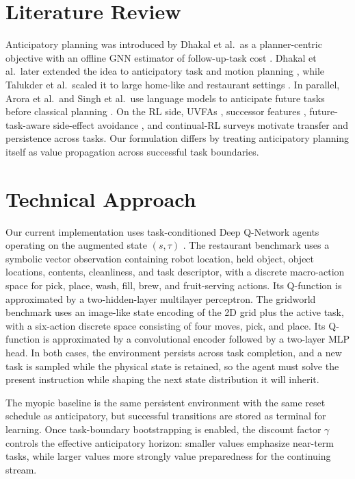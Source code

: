 \documentclass{article}
\begin{document}
\section{Literature Review}
Anticipatory planning was introduced by Dhakal et al.\ as a planner-centric objective with an offline GNN estimator of follow-up-task cost \cite{dhakal2023anticipatory}. Dhakal et al.\ later extended the idea to anticipatory task and motion planning \cite{dhakal2024tamp}, while Talukder et al.\ scaled it to large home-like and restaurant settings \cite{talukder2024large}. In parallel, Arora et al.\ and Singh et al.\ use language models to anticipate future tasks before classical planning \cite{arora2024anticipate,singh2024anticipate}. On the RL side, UVFAs \cite{schaul2015uvfa}, successor features \cite{barreto2017successor}, future-task-aware side-effect avoidance \cite{krakovna2020avoiding}, and continual-RL surveys \cite{khetarpal2022continual} motivate transfer and persistence across tasks. Our formulation differs by treating anticipatory planning itself as value propagation across successful task boundaries.

\section{Technical Approach}
Our current implementation uses task-conditioned Deep Q-Network agents operating on the augmented state $(s,\tau)$ \cite{mnih2015dqn}. The restaurant benchmark uses a symbolic vector observation containing robot location, held object, object locations, contents, cleanliness, and task descriptor, with a discrete macro-action space for pick, place, wash, fill, brew, and fruit-serving actions. Its Q-function is approximated by a two-hidden-layer multilayer perceptron. The gridworld benchmark uses an image-like state encoding of the 2D grid plus the active task, with a six-action discrete space consisting of four moves, pick, and place. Its Q-function is approximated by a convolutional encoder followed by a two-layer MLP head. In both cases, the environment persists across task completion, and a new task is sampled while the physical state is retained, so the agent must solve the present instruction while shaping the next state distribution it will inherit.

The myopic baseline is the same persistent environment with the same reset schedule as anticipatory, but successful transitions are stored as terminal for learning. Once task-boundary bootstrapping is enabled, the discount factor $\gamma$ controls the effective anticipatory horizon: smaller values emphasize near-term tasks, while larger values more strongly value preparedness for the continuing stream.
\end{document}
